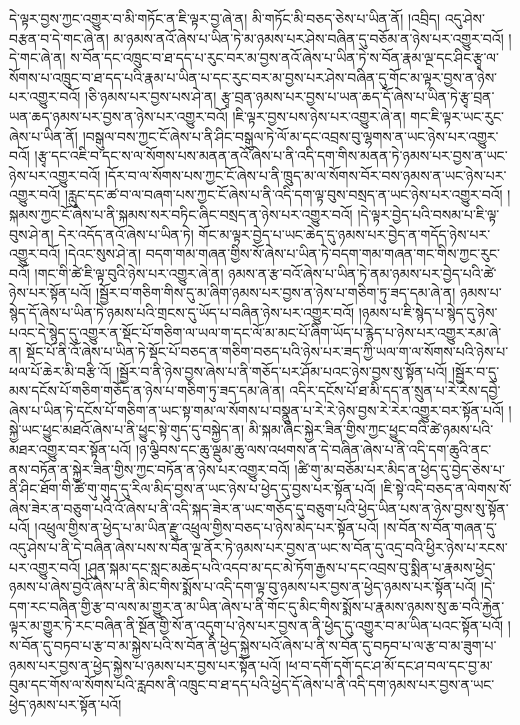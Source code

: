དེ་ལྟར་བྱས་ཀྱང་འགྱུར་བ་མི་གཏོང་ན་ཇི་ལྟར་བྱ་ཞེ་ན། མི་གཏོང་མི་བཅད་ཅེས་པ་ཡིན་ནོ། །འབྲིད། འདུ་ཤེས་བརྩན་བ་དེ་གང་ཞེ་ན། མ་ཉམས་ནའོ་ཞེས་པ་ཡིན་ཏེ་མ་ཉམས་པར་ཤེས་བཞིན་དུ་བཅོམ་ན་ཉེས་པར་འགྱུར་བའོ། །དེ་གང་ཞེ་ན། ས་བོན་དང་འཁྲུང་བ་ཐ་དད་པ་རུང་བར་མ་བྱས་ནའོ་ཞེས་པ་ཡིན་ཏེ་ས་བོན་རྣམ་ལྔ་དང་ཤིང་རྩྭ་ལ་སོགས་པ་འཁྲུང་བ་ཐ་དད་པའི་རྣམ་པ་ཡིན་པ་དང་རུང་བར་མ་བྱས་པར་ཤེས་བཞིན་དུ་གོང་མ་ལྟར་བྱས་ན་ཉེས་པར་འགྱུར་བའོ། །ཅི་ཉམས་པར་བྱས་པས་ཤེ་ན། རྩྭ་བྲན་ཉམས་པར་བྱས་པ་ཡན་ཆད་དོ་ཞེས་པ་ཡིན་ཏེ་རྩྭ་བྲན་ཡན་ཆད་ཉམས་པར་བྱས་ན་ཉེས་པར་འགྱུར་བའོ། །ཇི་ལྟར་བྱས་པས་ཉེས་པར་འགྱུར་ཞེ་ན། གང་ཇི་ལྟར་ཡང་རུང་ཞེས་པ་ཡིན་ནོ། །བསྒུལ་བས་ཀྱང་ངོ་ཞེས་པ་ནི་ཤིང་བསྒུལ་ཏེ་ལོ་མ་དང་འབྲས་བུ་ལྷགས་ན་ཡང་ཉེས་པར་འགྱུར་བའོ། །རྩྭ་དང་འཇི་བ་དང་ས་ལ་སོགས་པས་མནན་ནའོ་ཞེས་པ་ནི་འདི་དག་གིས་མནན་ཏེ་ཉམས་པར་བྱས་ན་ཡང་ཉེས་པར་འགྱུར་བའོ། །དོར་བ་ལ་སོགས་པས་ཀྱང་ངོ་ཞེས་པ་ནི་ཁྲུད་མ་ལ་སོགས་བོར་བས་ཉམས་ན་ཡང་ཉེས་པར་འགྱུར་བའོ། །རླུང་དང་ཚ་བ་ལ་བཞག་པས་ཀྱང་ངོ་ཞེས་པ་ནི་འདི་དག་ལྟ་བུས་བསྲད་ན་ཡང་ཉེས་པར་འགྱུར་བའོ། །སྐམས་ཀྱང་ངོ་ཞེས་པ་ནི་སྐམས་སར་བཏིང་ཞིང་བསྲད་ན་ཉེས་པར་འགྱུར་བའོ། །དེ་ལྟར་བྱེད་པའི་བསམ་པ་ཇི་ལྟ་བུས་ཤེ་ན། དེར་འདོད་ནའོ་ཞེས་པ་ཡིན་ཏེ། གོང་མ་ལྟར་བྱེད་པ་ཡང་ཆེད་དུ་ཉམས་པར་བྱེད་ན་གདོད་ཉེས་པར་འགྱུར་བའོ། །དེའང་སུས་ཤེ་ན། བདག་གམ་གཞན་གྱིས་སོ་ཞེས་པ་ཡིན་ཏེ་བདག་གམ་གཞན་གང་གིས་ཀྱང་རུང་བའོ། །གང་གི་ཚེ་ཇི་ལྟ་བུའི་ཉེས་པར་འགྱུར་ཞེ་ན། ཉམས་ན་རྩ་བའོ་ཞེས་པ་ཡིན་ཏེ་ནམ་ཉམས་པར་བྱེད་པའི་ཚེ་ཉེས་པར་སྟོན་པའོ། །སྦྱོར་བ་གཅིག་གིས་དུ་མ་ཞིག་ཉམས་པར་བྱས་ན་ཉེས་པ་གཅིག་ཏུ་ཟད་དམ་ཞེ་ན། ཉམས་པ་སྙེད་དོ་ཞེས་པ་ཡིན་ཏེ་ཉམས་པའི་གྲངས་དུ་ཡོད་པ་བཞིན་ཉེས་པར་འགྱུར་བའོ། །ཉམས་པ་ཇི་སྙེད་པ་སྙེད་དུ་ཉེས་པའང་དེ་སྙེད་དུ་འགྱུར་ན་སྡོང་པོ་གཅིག་ལ་ཡལ་ག་དང་ལོ་མ་མང་པོ་ཞིག་ཡོད་པ་རྙེད་པ་ཉེས་པར་འགྱུར་རམ་ཞེ་ན། སྡོང་པོ་ནི་འོ་ཞེས་པ་ཡིན་ཏེ་སྡོང་པོ་བཅད་ན་གཅིག་བཅད་པའི་ཉེས་པར་ཟད་ཀྱི་ཡལ་ག་ལ་སོགས་པའི་ཉེས་པ་ཕལ་པོ་ཆེར་མི་བརྩི་འོ། །སྦྱོར་བ་ནི་ཉེས་བྱས་ཞེས་པ་ནི་གཅོད་པར་ཤོམ་པའང་ཉེས་བྱས་སུ་སྟོན་པའོ། །སྦྱོར་བ་དུ་མས་དངོས་པོ་གཅིག་གཅོད་ན་ཉེས་པ་གཅིག་ཏུ་ཟད་དམ་ཞེ་ན། འདིར་དངོས་པོ་ཐ་མི་དད་ན་སྲུན་པ་རེ་རེས་དབྱེ་ཞེས་པ་ཡིན་ཏེ་དངོས་པོ་གཅིག་ན་ཡང་སྟ་གམ་ལ་སོགས་པ་བསྣུན་པ་རེ་རེ་ཉེས་བྱས་རེ་རེར་འགྱུར་བར་སྟོན་པའོ། །སྐྱེ་ཡང་ཕྱུང་མཐའོ་ཞེས་པ་ནི་ཕྱུང་སྟེ་གུད་དུ་བསྐྱེད་ན། མི་སྐམ་ཞིང་སྐྱེར་ཟིན་གྱིས་ཀྱང་ཕྱུང་བའི་ཚེ་ཉམས་པའི་མཐར་འགྱུར་བར་སྟོན་པའོ། །ཉ་ལྕིབས་དང་ཆུ་ལྡུམ་ཆུ་ལས་འཕགས་ན་དེ་བཞིན་ཞེས་པ་ནི་འདི་དག་ཆུའི་ནང་ནས་བཏོན་ན་སྐྱེར་ཟིན་གྱིས་ཀྱང་བཏོན་ན་ཉེས་པར་འགྱུར་བའོ། །ཚི་གུ་མ་བཅོམ་པར་མིད་ན་ཕྱེད་དུ་བྱེད་ཅེས་པ་ནི་ཤིང་ཐོག་གི་ཚི་གུ་གུད་དུ་རིལ་མིད་བྱས་ན་ཡང་ཉེས་པ་ཕྱེད་དུ་བྱས་པར་སྟོན་པའོ། །ཇི་སྟེ་འདི་བཅད་ན་ལེགས་སོ་ཞེས་ཟེར་ན་བཅུག་པའི་འོ་ཞེས་པ་ནི་འདི་སྐད་ཟེར་ན་ཡང་གཅོད་དུ་བཅུག་པའི་ཕྱེད་ཡིན་པས་ན་ཉེས་བྱས་སུ་སྟོན་པའོ། །འཕྲུལ་གྱིས་ན་ཕྱེད་པ་མ་ཡིན་རྫུ་འཕྲུལ་གྱིས་བཅད་པ་ཉེས་མེད་པར་སྟོན་པའོ། །ས་བོན་ས་བོན་གཞན་དུ་འདུ་ཤེས་པ་ནི་དེ་བཞིན་ཞེས་པས་ས་བོན་ལྔ་ནོར་ཏེ་ཉམས་པར་བྱས་ན་ཡང་ས་བོན་དུ་འདྲ་བའི་ཕྱིར་ཉེས་པ་རངས་པར་འགྱུར་བའོ། །ཤུན་སྐམ་དང་སླང་མཆེད་པའི་འདབ་མ་དང་མེ་ཏོག་རྒྱས་པ་དང་འབྲས་བུ་སྨིན་པ་རྣམས་ཕྱེད་ཉམས་པ་ཞེས་བྱའོ་ཞེས་པ་ནི་མིང་གིས་སྨོས་པ་འདི་དག་ལྟ་བུ་ཉམས་པར་བྱས་ན་ཕྱེད་ཉམས་པར་སྟོན་པའོ། །དེ་དག་རང་བཞིན་གྱི་རྩ་བ་ལས་མ་གྱུར་ན་མ་ཡིན་ཞེས་པ་ནི་གོང་དུ་མིང་གིས་སྨོས་པ་རྣམས་ཉམས་སུ་ཆ་བའི་རྐྱེན་ལྟར་མ་གྱུར་ཏེ་རང་བཞིན་ནི་སྔོན་གྱི་སོ་ན་འདུག་པ་ཉེས་པར་བྱས་ན་ནི་ཕྱེད་དུ་འགྱུར་བ་མ་ཡིན་པའང་སྟོན་པའོ། །ས་བོན་དུ་བཏབ་པ་རྩ་བ་མ་སྐྱེས་པའི་ས་བོན་ནི་ཕྱེད་སྐྱེས་པའོ་ཞེས་པ་ནི་ས་བོན་དུ་བཏབ་པ་ལ་རྩ་བ་མ་ཟུག་པ་ཉམས་པར་བྱས་ན་ཕྱེད་སྐྱེས་པ་ཉམས་པར་བྱས་པར་སྟོན་པའོ། །ཕ་བ་དགོ་དགོ་དང་ཤ་མོ་དང་ཤ་བལ་དང་བྱ་མ་བུམ་དང་གོས་ལ་སོགས་པའི་རླབས་ནི་འཁྲུང་བ་ཐ་དད་པའི་ཕྱེད་དོ་ཞེས་པ་ནི་འདི་དག་ཉམས་པར་བྱས་ན་ཡང་ཕྱེད་ཉམས་པར་སྟོན་པའོ། 